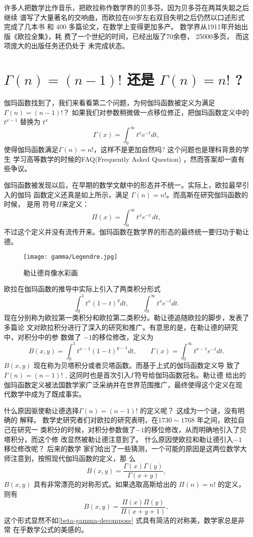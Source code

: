 {许多人把数学比作音乐，把欧拉称作数学界的贝多芬。因为贝多芬在两耳失聪之后继续
谱写了大量著名的交响曲，而欧拉在60岁左右双目失明之后仍然以口述形式完成了几本书
和 400 多篇论文，在数学上变得更加多产。 数学界从1911年开始出版《欧拉全集》，耗
费了一个世纪的时间，已经出版了70余卷， 25000多页， 而这项庞大的出版任务还仍处于
未完成状态。

\section{$ \Gamma(n) = (n-1)!$ 还是  $ \Gamma(n) = n! $ ? }

伽玛函数找到了，我们来看看第二个问题，为何伽玛函数被定义为满足
$\Gamma(n)=(n-1)!$？ 如果我们对参数稍微做一点移位修正，把伽玛函数定义中的 $t^{x-1}$
替换为 $t^x$ 
$$ \Gamma(x) = \int_0^{\infty} t^{x}e^{-t}dt , $$
使得伽玛函数满足$\Gamma(n)=n!$，这样不是更加自然吗? 这个问题也是理科背景的学生
学习高等数学的时候的FAQ(Frequently Asked Question) ，然而答案却一直有些争议。  

伽玛函数被发现以后，在早期的数学文献中的形态并不统一。实际上，欧拉最早引入的伽玛
函数定义还真是如上所示，满足 $\Gamma(n)=n!$。而高斯在研究伽玛函数的时候， 是用
符号$\Pi$来定义： 
$$ \Pi(x)=\int_{0}^\infty t^x e^{-t}\,dt ,$$ 
不过这个定义并没有流传开来。伽玛函数在数学界的形态的最终统一要归功于勒让德。

\begin{figure}[htbp]
\centering
\texttt{[image: gamma/Legendre.jpg]}
\caption{勒让德肖像水彩画}
\end{figure}

欧拉在伽玛函数的推导中实际上引入了两类积分形式
$$ \int_0^1 t^{x}(1-t)^{y}dt, \quad  \quad \int_0^{\infty} t^{x}e^{-t}dt .$$
现在分别称为欧拉第一类积分和欧拉第二类积分。勒让德追随欧拉的脚步，发表了多篇论
文对欧拉积分进行了深入的研究和推广。有意思的是，在勒让德的研究中，对积分中的参
数做了 $-1$的移位修改，定义为
$$ B(x, y) = \int_0^1 t^{x-1}(1-t)^{y-1}dt, \quad \quad  \Gamma(x) = \int_0^{\infty} t^{x-1}e^{-t}dt .$$
$B(x,y)$ 现在称为贝塔积分或者贝塔函数。而基于上式的伽玛函数定义导
致了 $ \Gamma(n) = (n-1)!$ , 这同时也是首次引入$\Gamma$符号给伽玛函数冠名。勒让德
给出的伽玛函数定义被法国数学家广泛采纳并在世界范围推广，最终使得这个定义在现
代数学中成为了既成事实。

什么原因驱使勒让德选择$\Gamma(n) = (n-1)!$ 的定义呢？ 这成为一个谜，没有明确的
解释。 数学史研究者们对欧拉的研究表明，在$1730\sim1768$ 年之间，欧拉自己在研究一
类积分的时候，对积分参数做了$-1$的移位修改，从而明确地引入了贝塔积分，而这个修
改显然被勒让德注意到了。 什么原因使欧拉和勒让德引入$-1$ 移位修改呢？ 后来的数学
家们给出了一些猜测，一个可能的原因是这两位数学大师注意到，按照现代伽玛函数的定义，那
么
\begin{equation}
\label{beta-gamma-decompose}
 B(x,y) = \frac{\Gamma(x)\Gamma(y)}{\Gamma(x+y)} ,
\end{equation}
$B(x,y)$ 具有非常漂亮的对称形式。如果选取高斯给出的 $\Pi(n)=n!$ 的定义，
则有
$$ B(x,y) = \frac{\Pi(x)\Pi(y)}{\Pi(x+y+1)} ,$$
这个形式显然不如\eqref{beta-gamma-decompose} 式具有简洁的对称美，数学家总是非常
在乎数学公式的美感的。

}
